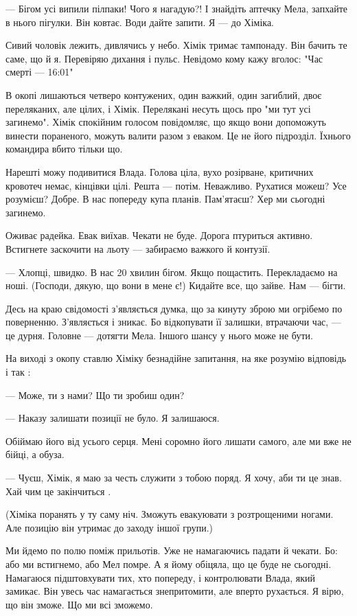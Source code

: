 — Бігом усі випили пілпаки! Чого я нагадую?! І знайдіть аптечку Мела, запхайте
в нього пігулки. Він ковтає. Води дайте запити.  Я — до Хіміка. 

Сивий чоловік лежить, дивлячись у небо. Хімік тримає тампонаду.  Він бачить те
саме, що й я. Перевіряю дихання і пульс. Невідомо кому кажу вголос: "Час смерті
— 16:01" 

В окопі лишаються четверо контужених,  один важкий, один загиблий, двоє
переляканих, але цілих, і Хімік.  Перелякані несуть щось про "ми тут усі
загинемо". Хімік спокійним голосом повідомляє, що якщо вони допоможуть винести
пораненого, можуть валити разом з еваком. Це не його підрозділ. Їхнього
командира вбито тільки що. 

Нарешті можу подивитися Влада. Голова ціла, вухо розірване, критичних кровотеч
немає, кінцівки цілі. Решта — потім. Неважливо. Рухатися можеш? Усе розумієш?
Добре. В нас попереду купа планів. Пам'ятаєш? Хер ми сьогодні загинемо. 

Оживає радейка. Евак виїхав. Чекати не буде. Дорога птуриться активно.
Встигнете заскочити на льоту — забираємо важкого й контузії.

— Хлопці, швидко. В нас 20 хвилин бігом. Якщо пощастить. Перекладаємо на ноші.
(Господи, дякую, що вони в мене є!) Кидайте все, що зайве. Нам — бігти. 

Десь на краю свідомості з'являється думка, що за кинуту зброю ми  огрібемо по
поверненню. З'являється і зникає. Бо відкопувати її залишки, втрачаючи час, —
це дурня. Головне — дотягти Мела. Іншого шансу у нього може не бути. 

На виході з окопу ставлю Хіміку безнадійне запитання, на яке розумію  відповідь
і так :

— Може, ти з нами? Що ти зробиш один?

— Наказу залишати позиції не було. Я залишаюся. 

Обіймаю його від усього серця.  Мені соромно його лишати самого, але ми вже не
бійці, а обуза. 

— Чуєш, Хімік, я маю за честь служити з тобою поряд. Я хочу, аби ти це знав.
Хай чим це закінчиться . 

(Хіміка поранять у ту саму ніч. Зможуть евакуювати з розтрощеними ногами. Але
позицію він утримає до заходу іншої групи.)

Ми йдемо по полю поміж прильотів. Уже не намагаючись падати й чекати. Бо: або
ми встигнемо, або Мел помре. А я йому обіцяла, що це буде не сьогодні.
Намагаюся підштовхувати тих, хто попереду, і контролювати Влада, який замикає.
Він увесь час намагається знепритомити, але вперто рухається.  Я вірю, що він
зможе. Що ми всі зможемо.  

